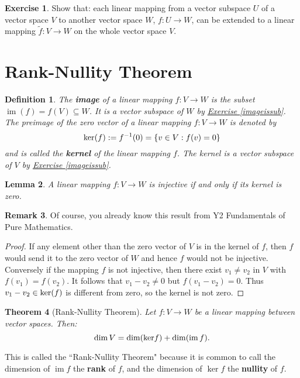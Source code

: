 \documentclass[11pt]{amsbook}
\DeclareMathOperator{\im}{\mathrm{im}}
\newtheorem{theorem}{Theorem}[section]
\newtheorem{definition}[theorem]{Definition}
\newtheorem{lemma}[theorem]{Lemma}
\theoremstyle{definition}
\newtheorem{rem}[theorem]{Remark}
\newtheorem{exercise}{Exercise}
\begin{document}
\begin{exercise} Show that: each linear mapping from a vector subspace $U$ of a vector space $V$ to another vector space $W$, $f:U \to W$, can be extended to a linear mapping $\tilde{f} : V\to W$ on the whole vector space $V$.\end{exercise}

\section{Rank-Nullity Theorem}
\begin{definition}The {\bf image} of a linear mapping $f:V \to W$ is the subset $\im (f) = f(V) \subseteq W$. It is a vector subspace of $W$ by \hyperref[imageissub]{Exercise \ref{imageissub}}. The preimage of the zero vector of a linear mapping $f: V\to W$ is denoted by $${\rm ker}(f):= f^{-1}(0) = \{ v\in V: f(v) = 0 \}$$ and is called the {\bf kernel} of the linear mapping $f$. The kernel is a vector subspace of $V$ by \hyperref[imageissub]{Exercise \ref{imageissub}}.
\end{definition}

\begin{lemma} \label{ker=0} A linear mapping $f:V \to W$ is injective if and only if its kernel is zero.
\end{lemma}

\begin{rem} Of course, you already know this result from Y2 Fundamentals of Pure Mathematics.\end{rem}

\begin{proof}
If any element other than the zero vector of $V$ is in the kernel of $f$, then $f$ would send it to the zero vector of $W$ and hence $f$ would not be injective. Conversely if the mapping $f$ is not injective, then there exist $v_1\neq v_2$ in $V$ with $f(v_1) = f(v_2)$. It follows that $v_1-v_2\neq 0$ but $f(v_1-v_2) = 0$. Thus $v_1-v_2 \in {\rm ker} (f)$ is different from zero, so the kernel is not zero.
\end{proof}

\begin{theorem}[{Rank-Nullity Theorem}] \label{rnthm} Let $f: V\to W$ be a linear mapping between vector spaces. Then:
$$\dim V = \dim ({\rm ker} f) + \dim (\im f).$$
\end{theorem}

This is called the ``Rank-Nullity Theorem" because it is common to call the dimension of $\im f$ the {\bf rank} of $f$, and the dimension of $\ker f$ the {\bf nullity} of $f$.
\end{document}
